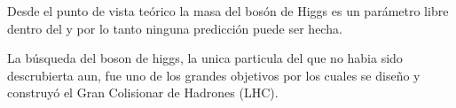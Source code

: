




Desde el punto de vista teórico la masa del bosón de Higgs es un parámetro
libre dentro del {\SM} y por lo tanto ninguna predicción puede ser hecha.

La b\'usqueda del boson de higgs, la unica particula del {\SM} que
no habia sido descrubierta aun, fue uno de los grandes objetivos por los
cuales se dise\~no y construyó el Gran Colisionar de Hadrones (LHC).


